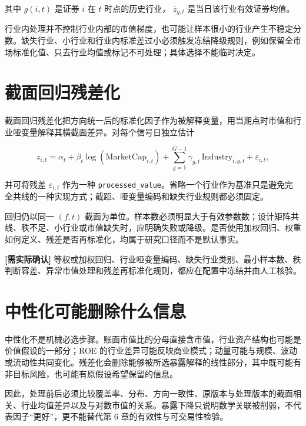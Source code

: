 其中 \(g(i,t)\) 是证券 \(i\) 在 \(t\) 时点的历史行业，
\(\overline{z}_{g,t}\) 是当日该行业有效证券均值。

行业内处理并不控制行业内部的市值梯度，也可能让样本很小的行业产生不稳定分数。缺失行业、小行业和行业内标准差过小必须触发冻结降级规则，例如保留全市场标准化值、只去行业均值或标记不可处理；具体选择不能临时决定。

\section{截面回归残差化}

截面回归残差化把方向统一后的标准化因子作为被解释变量，用当期点时市值和行业哑变量解释其横截面差异。对每个信号日独立估计

\begin{equation}
  z_{i,t}
  =
  \alpha_t
  +
  \beta_t\log\!\left(\mathrm{MarketCap}_{i,t}\right)
  +
  \sum_{g=1}^{G-1}
  \gamma_{g,t}\,
  \mathrm{Industry}_{i,g,t}
  +
  \varepsilon_{i,t},
  \label{eq:ch05-residualization}
\end{equation}

并可将残差 \(\varepsilon_{i,t}\) 作为一种
\texttt{processed\_value}。省略一个行业作为基准只是避免完全共线的一种实现方式；截距、哑变量编码和缺失行业规则都必须固定。

回归仍以同一 \((f,t)\) 截面为单位。样本数必须明显大于有效参数数；设计矩阵共线、秩不足、小行业或市值缺失时，应明确失败或降级。是否使用加权回归、权重如何定义、残差是否再标准化，均属于研究口径而不是默认事实。

\begin{confirmbox}
\textbf{[需实际确认]} 等权或加权回归、行业哑变量编码、缺失行业类别、最小样本数、秩判断容差、异常市值处理和残差再标准化规则，都应在配置中冻结并由人工核验。
\end{confirmbox}

\section{中性化可能删除什么信息}

中性化不是机械必选步骤。账面市值比的分母直接含市值，行业资产结构也可能是价值假设的一部分；ROE 的行业差异可能反映商业模式；动量可能与规模、波动或流动性共同变化。残差化会删除能够被所选暴露解释的线性部分，其中既可能有非目标风险，也可能有原假设希望保留的信息。

因此，处理前后必须比较覆盖率、分布、方向一致性、原版本与处理版本的截面相关、行业均值差异以及与对数市值的关系。暴露下降只说明数学关联被削弱，不代表因子“更好”，更不能替代第 6 章的有效性与可交易性检验。

